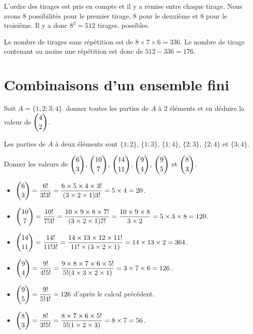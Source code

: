 \documentclass[11pt,fleqn, openany]{book} %
\begin{document}
\begin{solution}
L'ordre des tirages est pris en compte et il y a remise entre chaque tirage. Nous avons 8 possibilités pour le premier tirage, 8 pour le deuxième et 8 pour le troisième. Il y a donc $8^3=512$ tirages. possibles.

Le nombre de tirages sans répétition est de $8 \times 7 \times 6 =336$. Le nombre de tirage contenant au moins une répétition est donc de $512-336=176$.\newpage\end{solution}




\section*{Combinaisons d'un ensemble fini}

\begin{exercise}[topic=comb03]Soit $A=\{1;2;3;4\}$. donner toutes les parties de $A$ à 2 éléments et en déduire la valeur de $\dbinom{4}{2}$.\end{exercise}

\begin{solution}Les parties de $A$ à deux éléments sont $\{1;2\}$, $\{1;3\}$, $\{1;4\}$, $\{2;3\}$, $\{2;4\}$ et $\{3;4\}$.\end{solution}



\begin{exercise}[topic=comb03]Donner les valeurs de $\dbinom{6}{3}$, $\dbinom{10}{7}$, $\dbinom{14}{11}$,  $\dbinom{9}{4}$, $\dbinom{9}{5}$ et $\dbinom{8}{3}$.\end{exercise}

\begin{solution}\hspace{0pt}
 \begin{itemize}
 \item $\dbinom{6}{3}=\dfrac{6!}{3!3!}=\dfrac{6 \times 5 \times 4 \times 3!}{(3 \times 2 \times 1)3!}=5 \times 4 =20$.

\item $\dbinom{10}{7}=\dfrac{10!}{7!3!}=\dfrac{10 \times 9 \times 8 \times 7!}{(3 \times 2 \times 1)7!}=\dfrac{10 \times 9 \times 8}{3 \times 2} = 5 \times 3 \times 8 = 120$.

\item $\dbinom{14}{11}=\dfrac{14!}{11!3!}=\dfrac{14 \times 13 \times 12 \times 11!}{11! \times (3 \times 2 \times 1)}=14 \times 13 \times 2 = 364$.

\item $\dbinom{9}{4}=\dfrac{9!}{4!5!}=\dfrac{9 \times 8 \times 7 \times 6 \times 5!}{5!(4 \times 3 \times 2 \times 1)}=3 \times 7 \times 6 = 126$.

\item $\dbinom{9}{5}=\dfrac{9!}{5!4!}=126$ d'après le calcul précédent.

\item $\dbinom{8}{3}=\dfrac{8!}{3!5!}=\dfrac{8 \times 7 \times 6 \times 5!}{5!(1 \times 2 \times 3)}=8\times 7 = 56$.\end{itemize}
\end{solution}
\end{document}
